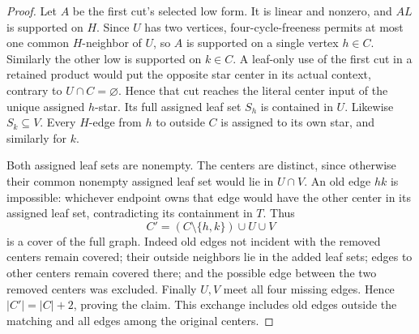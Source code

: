 \documentclass[11pt]{article}
\theoremstyle{definition}
\theoremstyle{remark}
\begin{document}
\begin{proof}
Let $A$ be the first cut's selected low form. It is linear and nonzero, and $AL$ is supported on $H$. Since $U$ has two vertices, four-cycle-freeness permits at most one common $H$-neighbor of $U$, so $A$ is supported on a single vertex $h\in C$. Similarly the other low is supported on $k\in C$. A leaf-only use of the first cut in a retained product would put the opposite star center in its actual context, contrary to $U\cap C=\varnothing$. Hence that cut reaches the literal center input of the unique assigned $h$-star. Its full assigned leaf set $S_h$ is contained in $U$. Likewise $S_k\subseteq V$. Every $H$-edge from $h$ to outside $C$ is assigned to its own star, and similarly for $k$.

Both assigned leaf sets are nonempty. The centers are distinct, since otherwise their common nonempty assigned leaf set would lie in $U\cap V$. An old edge $hk$ is impossible: whichever endpoint owns that edge would have the other center in its assigned leaf set, contradicting its containment in $T$. Thus
\[
 C'=(C\setminus\{h,k\})\cup U\cup V
\]
is a cover of the full graph. Indeed old edges not incident with the removed centers remain covered; their outside neighbors lie in the added leaf sets; edges to other centers remain covered there; and the possible edge between the two removed centers was excluded. Finally $U,V$ meet all four missing edges. Hence $|C'|=|C|+2$, proving the claim. This exchange includes old edges outside the matching and all edges among the original centers.
\end{proof}
\end{document}
